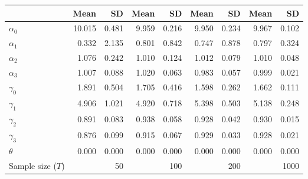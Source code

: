 
\begin{tabular}[t]{lrrrrrrrr}
\toprule
  & Mean & SD & Mean  & SD  & Mean   & SD   & Mean    & SD   \\
\midrule
$\alpha_{0}$ & 10.015 & 0.481 & 9.959 & 0.216 & 9.950 & 0.234 & 9.967 & 0.102\\
$\alpha_{1}$ & 0.332 & 2.135 & 0.801 & 0.842 & 0.747 & 0.878 & 0.797 & 0.324\\
$\alpha_{2}$ & 1.076 & 0.242 & 1.010 & 0.124 & 1.012 & 0.079 & 1.010 & 0.048\\
$\alpha_{3}$ & 1.007 & 0.088 & 1.020 & 0.063 & 0.983 & 0.057 & 0.999 & 0.021\\
$\gamma_{0}$ & 1.891 & 0.504 & 1.705 & 0.416 & 1.598 & 0.262 & 1.662 & 0.111\\
$\gamma_{1}$ & 4.906 & 1.021 & 4.920 & 0.718 & 5.398 & 0.503 & 5.138 & 0.248\\
$\gamma_{2}$ & 0.891 & 0.083 & 0.938 & 0.058 & 0.928 & 0.042 & 0.930 & 0.015\\
$\gamma_{3}$ & 0.876 & 0.099 & 0.915 & 0.067 & 0.929 & 0.033 & 0.928 & 0.021\\
$\theta$ & 0.000 & 0.000 & 0.000 & 0.000 & 0.000 & 0.000 & 0.000 & 0.000\\
Sample size ($T$) &  & 50 &  & 100 &  & 200 &  & 1000\\
\bottomrule
\end{tabular}
